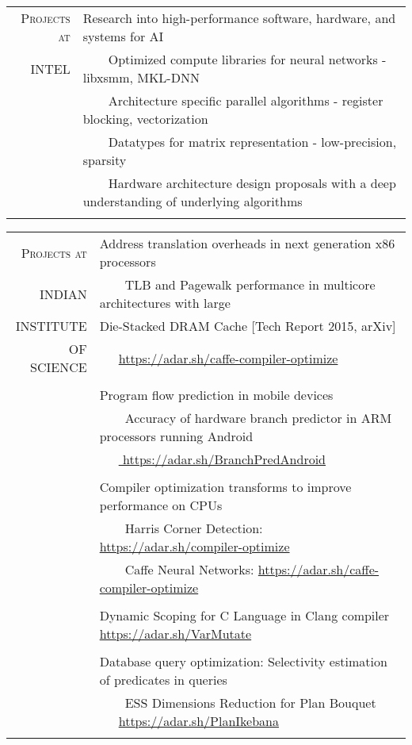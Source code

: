 \documentclass[a4paper,10pt]{article} %
\newcommand{\tabitem}{~~\llap{\textbullet}~~}
\begin{document}
\begin{tabular}{rp{12cm}}
	\textsc{Projects at}  & Research into high-performance software, hardware, and systems for AI \\
	\textsc{INTEL} &   \tabitem Optimized compute libraries for neural networks - libxsmm, MKL-DNN \\
	& \tabitem Architecture specific parallel algorithms - register blocking, vectorization  \\
	& \tabitem Datatypes for matrix representation - low-precision, sparsity \\
	& \tabitem Hardware architecture design proposals with a deep understanding of underlying algorithms\\
	&\\
\end{tabular}

\begin{tabular}{rp{12cm}}
	\textsc{Projects at} &  Address translation overheads in next generation x86 processors\\
	\textsc{INDIAN} &  \tabitem TLB and Pagewalk performance in multicore architectures with large\\
	\textsc{INSTITUTE} &   Die-Stacked DRAM Cache \hfill [Tech Report 2015, arXiv] \\
	\textsc{OF SCIENCE} & ~~~\href{https://adar.sh/caffe-compiler-optimize}{https://adar.sh/caffe-compiler-optimize}\\
	& \\
	& Program flow prediction in mobile devices \\
	& \tabitem Accuracy of hardware branch predictor in ARM processors running Android \\
	& ~~~\href{https://adar.sh/BranchPredAndroid}{ https://adar.sh/BranchPredAndroid} \\
	& \\
	& Compiler optimization transforms to improve performance on CPUs\\
	& \tabitem Harris Corner Detection: \href{https://adar.sh/compiler-optimize}{https://adar.sh/compiler-optimize}\\
	& \tabitem Caffe Neural Networks:  \href{https://adar.sh/caffe-compiler-optimize}{https://adar.sh/caffe-compiler-optimize}\\
	& \\
	& Dynamic Scoping for C Language in Clang compiler \href{https://adar.sh/VarMutate}{https://adar.sh/VarMutate} \\
	& \\
	& Database query optimization: Selectivity estimation of predicates in queries \\
	& \tabitem ESS Dimensions Reduction for Plan Bouquet ~~~\href{https://adar.sh/PlanIkebana}{https://adar.sh/PlanIkebana}\\
	&\\
\end{tabular}
\end{document}
